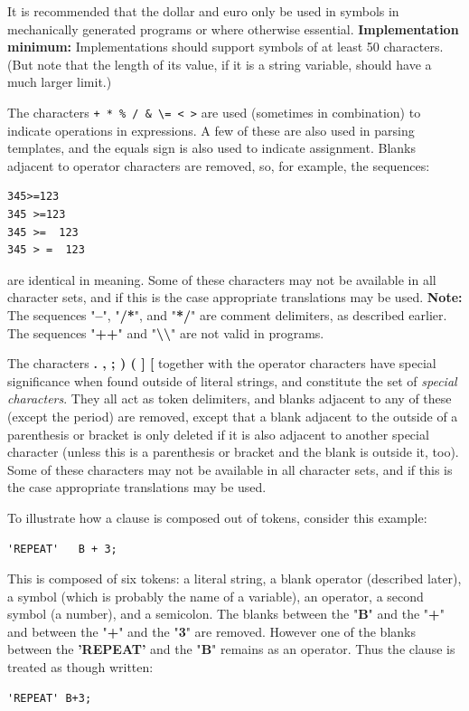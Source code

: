 \begin{description}
It is recommended that the dollar and euro only be used in symbols in
mechanically generated programs or where otherwise essential.
 \textbf{Implementation minimum:} Implementations should support
symbols of at least 50 characters.
(But note that the length of its value, if it is a string variable,
should have a much larger limit.)
\item[Operator characters]\label{refopers}

The characters \texttt{+ \textendash \-  * \% \textbar / \& \textbackslash = < >}
are used (sometimes in combination) to indicate
 operations %
 in expressions.
A few of these are also used in parsing templates, and the equals sign
is also used to indicate assignment.
Blanks adjacent to operator characters are removed, so, for example,
the sequences:
\begin{lstlisting}
345>=123
345 >=123
345 >=  123
345 > =  123
\end{lstlisting}
are identical in meaning.
 Some of these characters may not be available in all character sets,
and if this is the case appropriate translations may be used.
\textbf{Note: }The sequences "\textbf{--}", "\textbf{/*}", and
"\textbf{*/}" are comment delimiters, as described earlier.
The sequences "\textbf{++}"
and "\textbf{\textbackslash \textbackslash }" are not valid in \crexx{}
programs.
\item[Special characters]\label{refspecs}

The characters  \textbf{.  ,  ;  )  (  ]  [}  together
with the operator characters have special significance when found
outside of literal strings, and constitute the set of \emph{special
characters}.
They all act as token delimiters, and blanks adjacent to any of these
(except the period) are removed, except that a blank adjacent to the
outside of a parenthesis or bracket is only deleted if it is also
adjacent to another special character (unless this is a parenthesis or
bracket and the blank is outside it, too).
 Some of these characters may not be available in all character sets,
and if this is the case appropriate translations may be used.
\end{description}
 To illustrate how a clause is composed out of tokens, consider this
example:
\begin{lstlisting}
'REPEAT'   B + 3;
\end{lstlisting}
This is composed of six tokens: a literal string, a blank operator
(described later), a symbol (which is probably the name of a variable),
an operator, a second symbol (a number), and a semicolon.
The blanks between the "\textbf{B}" and the "\textbf{+}"
and between the "\textbf{+}" and the "\textbf{3}" are
removed.
However one of the blanks between the \textbf{'REPEAT'} and the
"\textbf{B}" remains as an operator.
Thus the clause is treated as though written:
\begin{lstlisting}
'REPEAT' B+3;
\end{lstlisting}
